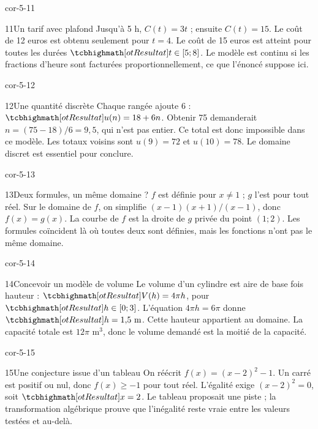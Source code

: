 \begin{blocLivre}{cor-5-11}
\begin{corrige}{11}{Un tarif avec plafond}
Jusqu’à 5 h, $C(t)=3t$ ; ensuite $C(t)=15$. Le coût de 12 euros est obtenu seulement pour $t=4$. Le coût de 15 euros est atteint pour toutes les durées $\res{t\in[5;8]}$. Le modèle est continu si les fractions d’heure sont facturées proportionnellement, ce que l’énoncé suppose ici.
\label{fig-cor-5-11}
\end{corrige}
\end{blocLivre}
\begin{blocLivre}{cor-5-12}
\begin{corrige}{12}{Une quantité discrète}
Chaque rangée ajoute 6 : $\res{u(n)=18+6n}$. Obtenir 75 demanderait $n=(75-18)/6=9{,}5$, qui n’est pas entier. Ce total est donc impossible dans ce modèle. Les totaux voisins sont $u(9)=72$ et $u(10)=78$. Le domaine discret est essentiel pour conclure.
\end{corrige}
\end{blocLivre}
\begin{blocLivre}{cor-5-13}
\begin{corrige}{13}{Deux formules, un même domaine ?}
$f$ est définie pour $x\ne1$ ; $g$ l’est pour tout réel. Sur le domaine de $f$, on simplifie $(x-1)(x+1)/(x-1)$, donc $f(x)=g(x)$. La courbe de $f$ est la droite de $g$ privée du point $(1;2)$. Les formules coïncident là où toutes deux sont définies, mais les fonctions n’ont pas le même domaine.
\end{corrige}
\end{blocLivre}
\begin{blocLivre}{cor-5-14}
\begin{corrige}{14}{Concevoir un modèle de volume}
Le volume d’un cylindre est aire de base fois hauteur : $\res{V(h)=4\pi h}$, pour $\res{h\in[0;3]}$. L’équation $4\pi h=6\pi$ donne $\res{h=1{,}5\text{ m}}$. Cette hauteur appartient au domaine. La capacité totale est $12\pi$ m$^3$, donc le volume demandé est la moitié de la capacité.
\label{fig-cor-5-14}
\end{corrige}
\end{blocLivre}
\begin{blocLivre}{cor-5-15}
\begin{corrige}{15}{Une conjecture issue d’un tableau}
On réécrit $f(x)=(x-2)^2-1$. Un carré est positif ou nul, donc $f(x)\ge-1$ pour tout réel. L’égalité exige $(x-2)^2=0$, soit $\res{x=2}$. Le tableau proposait une piste ; la transformation algébrique prouve que l’inégalité reste vraie entre les valeurs testées et au-delà.
\end{corrige}
\end{blocLivre}
